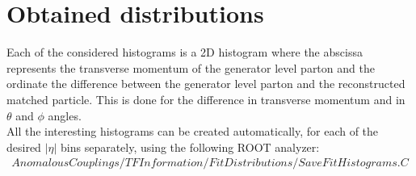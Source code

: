 \section{Obtained distributions}\label{subsec::FitRanges}
Each of the considered histograms is a 2D histogram where the abscissa represents the transverse momentum of the generator level parton and the ordinate the difference between the generator level parton and the reconstructed matched particle. This is done for the difference in transverse momentum and in $\theta$ and $\phi$ angles.\\
All the interesting histograms can be created automatically, for each of the desired $\vert \eta \vert$ bins separately, using the following ROOT analyzer:
\begin{eqnarray*}
 AnomalousCouplings/TFInformation/FitDistributions/SaveFitHistograms.C
\end{eqnarray*}

